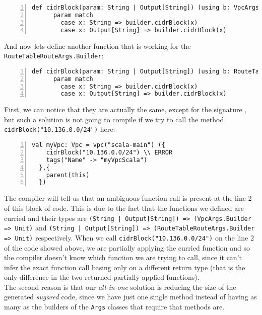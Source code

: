 \begin{minipage}{\linewidth}
\begin{lstlisting}[numbers=left, numberstyle=\tiny, numbersep=-5pt, stepnumber=1, linewidth=420pt]
  def cidrBlock(param: String | Output[String]) (using b: VpcArgs.Builder): Unit =
      param match
        case x: String => builder.cidrBlock(x)
        case x: Output[String] => builder.cidrBlock(x)
\end{lstlisting}
\end{minipage}
And now lets define another function that is working for the \texttt{RouteTableRouteArgs.Builder}:\\
\begin{minipage}{\linewidth}
\begin{lstlisting}[numbers=left, numberstyle=\tiny, numbersep=-5pt, stepnumber=1, linewidth=420pt]
  def cidrBlock(param: String | Output[String]) (using b: RouteTableRouteArgs.Builder): Unit =
      param match
        case x: String => builder.cidrBlock(x)
        case x: Output[String] => builder.cidrBlock(x)
\end{lstlisting}
\end{minipage}
First, we can notice that they are actually the same, except for the signature , but such a solution is not going to compile if we try to call the method \texttt{cidrBlock("10.136.0.0/24")} here:\\
\begin{minipage}{\linewidth}
\begin{lstlisting}[numbers=left, numberstyle=\tiny, numbersep=-5pt, stepnumber=1, linewidth=420pt]
  val myVpc: Vpc = vpc("scala-main") ({
    cidrBlock("10.136.0.0/24") \\ ERROR
    tags("Name" -> "myVpcScala")
  },{
    parent(this)
  })
\end{lstlisting}
\end{minipage}
The compiler will tell us that an ambiguous function call is present at the line 2 of this block of code.
This is due to the fact that the functions we defined are curried and their types are \texttt{(String | Output[String]) => (VpcArgs.Builder => Unit)} and \texttt{(String | Output[String]) => (RouteTableRouteArgs.Builder => Unit)} respectively.
When we call \texttt{cidrBlock("10.136.0.0/24")} on the line 2 of the code showed above, we are partially applying the curried function and so the compiler doesn't know which function we are trying to call, since it can't infer the exact function call basing only on a different return type (that is the only difference in the two returned partially applied functions).\\
The second reason is that our \textit{all-in-one} solution is reducing the size of the generated \textit{sugared} code, since we have just one single method instead of having as many as the builders of the \texttt{Args} classes that require that methods are.\\

